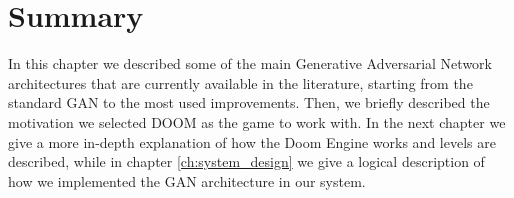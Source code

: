 \section{Summary}
In this chapter we described some of the main Generative Adversarial Network architectures that are currently available in the literature, starting from the standard GAN to the most used improvements. Then, we briefly described the motivation we selected DOOM as the game to work with. In the next chapter we give a more in-depth explanation of how the Doom Engine works and levels are described, while in chapter \ref{ch:system_design} we give a logical description of how we implemented the GAN architecture in our system. 